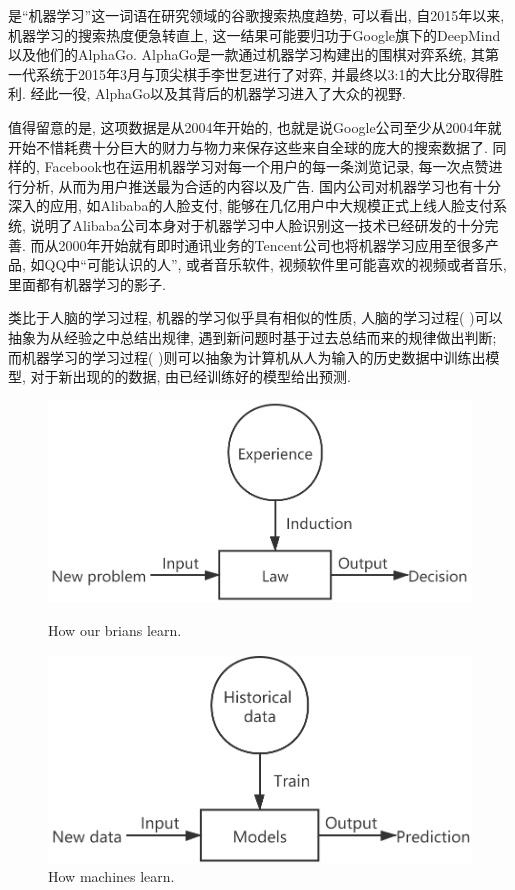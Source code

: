 \documentclass[lang=cn,11pt,a4paper]{elegantpaper}
\begin{document}
\par {} 是“机器学习”这一词语在研究领域的谷歌搜索热度趋势\cite{GT}, 可以看出, 自2015年以来, 机器学习的搜索热度便急转直上, 这一结果可能要归功于Google旗下的DeepMind以及他们的AlphaGo. AlphaGo是一款通过机器学习构建出的围棋对弈系统, 其第一代系统于2015年3月与顶尖棋手李世乭进行了对弈, 并最终以3:1的大比分取得胜利. 经此一役, AlphaGo以及其背后的机器学习进入了大众的视野. 
\par 值得留意的是, 这项数据是从2004年开始的, 也就是说Google公司至少从2004年就开始不惜耗费十分巨大的财力与物力来保存这些来自全球的庞大的搜索数据了. 同样的, Facebook也在运用机器学习对每一个用户的每一条浏览记录, 每一次点赞进行分析, 从而为用户推送最为合适的内容以及广告. 国内公司对机器学习也有十分深入的应用, 如Alibaba的人脸支付, 能够在几亿用户中大规模正式上线人脸支付系统, 说明了Alibaba公司本身对于机器学习中人脸识别这一技术已经研发的十分完善. 而从2000年开始就有即时通讯业务的Tencent公司也将机器学习应用至很多产品, 如QQ中“可能认识的人”, 或者音乐软件, 视频软件里可能喜欢的视频或者音乐, 里面都有机器学习的影子.
\par 类比于人脑的学习过程, 机器的学习似乎具有相似的性质, 人脑的学习过程( )可以抽象为从经验之中总结出规律, 遇到新问题时基于过去总结而来的规律做出判断; 而机器学习的学习过程( )则可以抽象为计算机从人为输入的历史数据中训练出模型, 对于新出现的的数据, 由已经训练好的模型给出预测. 
\begin{figure}[htbp]
	\centering
	\begin{minipage}[t]{0.45\textwidth}
	\centering
	\includegraphics[width=1\textwidth]{Brian}
	\caption{How our brians learn.\label{fig:Brian}}
	\end{minipage}
	\begin{minipage}[t]{0.45\textwidth}
	\centering
	\includegraphics[width=1\textwidth]{Machine}
	\caption{How machines learn.\label{fig:Machine}}
	\end{minipage}
\end{figure}
\end{document}
